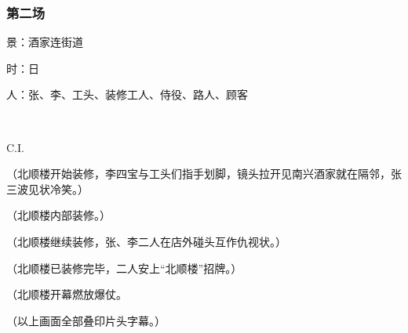 \subsubsection*{第二场}


\par 景：酒家连街道
\par 时：日
\par 人：张、李、工头、装修工人、侍役、路人、顾客
\par  
\par C.I.
\par （北顺楼开始装修，李四宝与工头们指手划脚，镜头拉开见南兴酒家就在隔邻，张三波见状冷笑。）
\par {}
\par （北顺楼内部装修。）
\par {}
\par （北顺楼继续装修，张、李二人在店外碰头互作仇视状。）
\par {}
\par （北顺楼已装修完毕，二人安上“北顺楼”招牌。）
\par {}
\par （北顺楼开幕燃放爆仗。
\par （以上画面全部叠印片头字幕。）
\par {}




\subsubsection*{}







\subsubsection*{}







\subsubsection*{}







\subsubsection*{}







